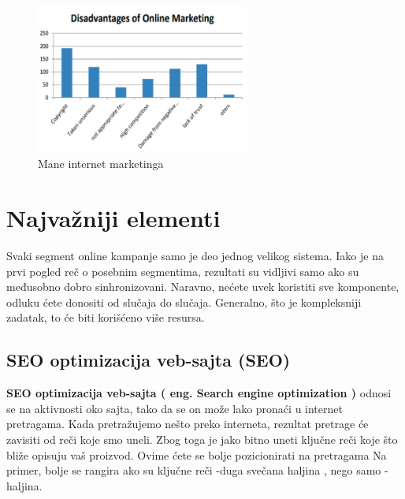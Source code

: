 \documentclass[a4paper]{article}
\begin{document}
{\begin{figure}[h!]
\begin{center}
\includegraphics[width=7cm]{slika.mane.marketinga.jpg}
\end{center}
\caption{Mane internet marketinga}
\label{fig:mane}
\end{figure}
\label{fig:mane}
\section{Najvažniji elementi}
\label{sec:najvažniji elementi}
Svaki segment online kampanje samo je deo jednog velikog sistema. Iako je na prvi pogled reč o posebnim segmentima, rezultati su vidljivi samo ako su međusobno dobro sinhronizovani. Naravno, nećete uvek koristiti sve komponente, odluku ćete donositi od slučaja do slučaja. Generalno, što je kompleksniji zadatak, to će biti korišćeno više resursa.
\subsection{SEO optimizacija veb-sajta (SEO)}
\label{subsec:SEO}
\textbf {SEO optimizacija veb-sajta  ( eng. Search engine optimization )} odnosi se na aktivnosti oko sajta, tako da se on može lako pronaći u internet pretragama. Kada pretražujemo nešto preko interneta, rezultat pretrage će zavisiti od reči koje smo uneli. Zbog toga je jako bitno uneti ključne reči koje što bliže opisuju vaš proizvod. Ovime ćete se bolje pozicionirati na pretragama
Na primer, bolje se rangira ako su ključne reči -duga svečana haljina  , nego samo -haljina.
}
\end{document}
